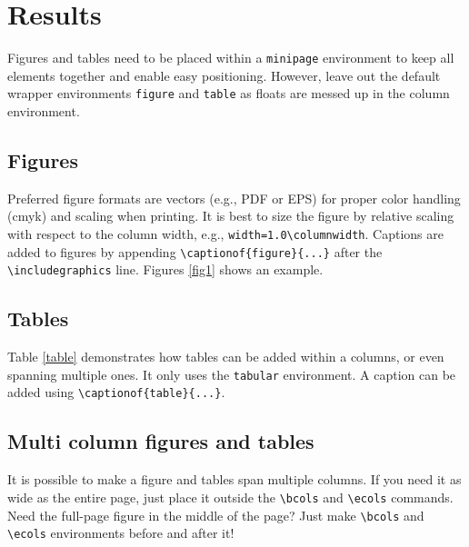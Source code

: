 \documentclass{article}
\begin{document}
\columnbreak %

\section*{Results}
Figures and tables need to be placed within a \verb|minipage| environment to keep all elements together and enable easy positioning.
However, leave out the default \latex wrapper environments \verb|figure| and \verb|table| as floats are messed up in the column environment.

\subsection*{Figures}

Preferred figure formats are vectors (e.g., PDF or EPS) for proper color handling (cmyk) and scaling when printing. It is best to size the figure by relative scaling with respect to the column width, e.g., \verb|width=1.0\columnwidth|.
Captions are added to figures by appending \verb|\captionof{figure}{...}| after the \verb|\includegraphics| line. Figures \ref{fig1} shows an example.

\subsection*{Tables}
Table \ref{table} demonstrates how tables can be added within a columns, or even spanning multiple ones. It only uses the \verb|tabular| environment. A caption can be added using \verb|\captionof{table}{...}|. 

\subsection*{Multi column figures and tables}
It is possible to make a figure and tables span multiple columns. If you need it as wide as the entire page, just place it outside the \verb|\bcols| and \verb|\ecols| commands. Need the full-page figure in the middle of the page? Just make \verb|\bcols| and \verb|\ecols| environments before and after it!

\pushdown
\begin{minipage}[b]{\columnwidth}
\end{minipage}

\columnbreak

\vspace{20pt plus 10pt minus 5pt}
\vspace{-1em}
\end{document}
